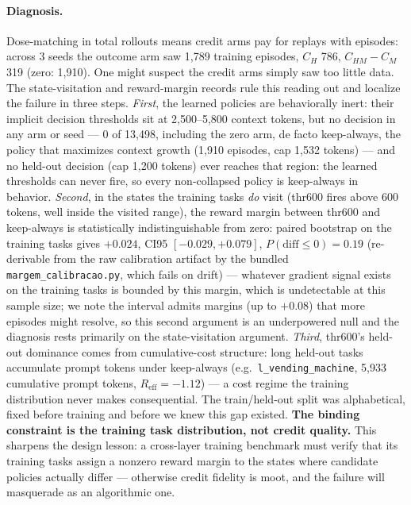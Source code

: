 \documentclass{article}
\theoremstyle{remark}
\begin{document}
\paragraph{Diagnosis.} Dose-matching in total rollouts means credit arms pay
for replays with episodes: across 3 seeds the outcome arm saw 1{,}789
training episodes, $C_H$ 786, $C_{HM}-C_M$ 319 (zero: 1{,}910). One might
suspect the credit arms simply saw too little data. The state-visitation and
reward-margin records rule this reading out and localize the failure in
three steps. \emph{First}, the learned policies are behaviorally inert: their
implicit decision thresholds sit at 2{,}500--5{,}800 context tokens, but no
decision in any arm or seed --- 0 of 13{,}498, including the zero arm, de
facto keep-always, the policy that maximizes context growth (1{,}910
episodes, cap 1{,}532 tokens) --- and no held-out decision (cap 1{,}200
tokens) ever reaches that region: the learned thresholds can never fire, so
every non-collapsed policy is keep-always in behavior. \emph{Second}, in the
states the training tasks \emph{do} visit (thr600 fires above 600 tokens,
well inside the visited range), the reward margin between thr600 and
keep-always is statistically indistinguishable from zero: paired bootstrap
on the training tasks
gives $+0.024$, CI95 $[-0.029, +0.079]$, $P(\text{diff} \leq 0) = 0.19$
(re-derivable from the raw calibration artifact by the bundled
\texttt{margem\_calibracao.py}, which fails on drift) ---
whatever gradient signal exists on the training tasks is bounded by this
margin, which is undetectable at this sample size; we note the interval
admits margins (up to $+0.08$) that more episodes might resolve, so this
second argument is an underpowered null and the diagnosis rests primarily
on the state-visitation argument.
\emph{Third}, thr600's held-out dominance comes from cumulative-cost
structure: long held-out tasks accumulate prompt tokens under keep-always
(e.g.\ \texttt{l\_vending\_machine}, 5{,}933 cumulative prompt tokens,
$R_{\text{eff}} = -1.12$) --- a cost regime the training distribution never
makes consequential. The train/held-out split was alphabetical, fixed before
training and before we knew this gap existed.
\textbf{The binding constraint is the training task distribution, not credit
quality.} This sharpens the design lesson: a
cross-layer training benchmark must verify that its training tasks assign a
nonzero reward margin to the states where candidate policies actually differ
--- otherwise credit fidelity is moot, and the failure will masquerade as an
algorithmic one.
\end{document}
